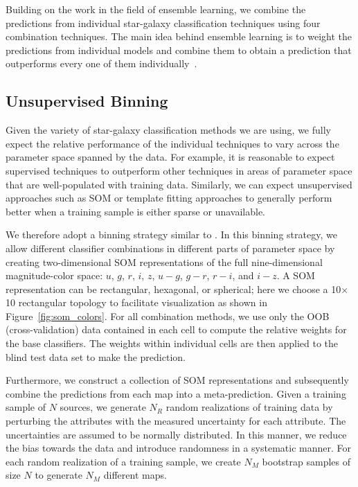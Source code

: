 \documentclass[useAMS,usenatbib]{mn2e}
\begin{document}
Building on the work in the field of ensemble learning,
we combine the predictions from
individual star-galaxy classification techniques
using four combination techniques.
The main idea behind ensemble learning is to weight
the predictions from individual models
and combine them to obtain a prediction
that outperforms every one of 
them individually~\citep{rokach2010ensemble}.

\subsection{Unsupervised Binning}
  \label{section:random_atlas}

Given the variety of star-galaxy classification methods
we are using,
we fully expect the relative performance
of the individual techniques to vary across
the parameter space spanned by the data.
For example, it is reasonable to expect 
supervised techniques to outperform other techniques
in areas of parameter space that are well-populated
with training data.
Similarly, we can expect unsupervised approaches
such as SOM or template fitting approaches 
to generally perform better when a training sample
is either sparse or unavailable.

We therefore adopt a binning strategy similar to 
\cite{carrascokind2014exhausting}.
In this binning strategy,
we allow different classifier combinations 
in different parts of parameter space
by creating two-dimensional SOM representations of
the full nine-dimensional magnitude-color space:
$u$, $g$, $r$, $i$, $z$, $u-g$, $g-r$, $r-i$, and $i-z$.
A SOM representation can be rectangular, hexagonal, or spherical;
here we choose a 10$\times$10 rectangular topology to facilitate 
visualization as shown in Figure~\ref{fig:som_colors}.
For all combination methods,
we use only the OOB (cross-validation) data contained in each cell
to compute the relative weights for the base classifiers.
The weights within individual cells are then applied to
the blind test data set to make the prediction.

Furthermore, we construct a collection of SOM representations
and subsequently combine the predictions from each map
into a meta-prediction.
Given a training sample of $N$ sources,
we generate $N_R$ random realizations of training data
by perturbing the attributes
with the measured uncertainty for each attribute.
The uncertainties are assumed to be normally distributed.
In this manner,
we reduce the bias towards the data
and introduce randomness in a systematic manner.
For each random realization of a training sample,
we create $N_M$ bootstrap samples of size $N$
to generate $N_M$ different maps.
\end{document}
